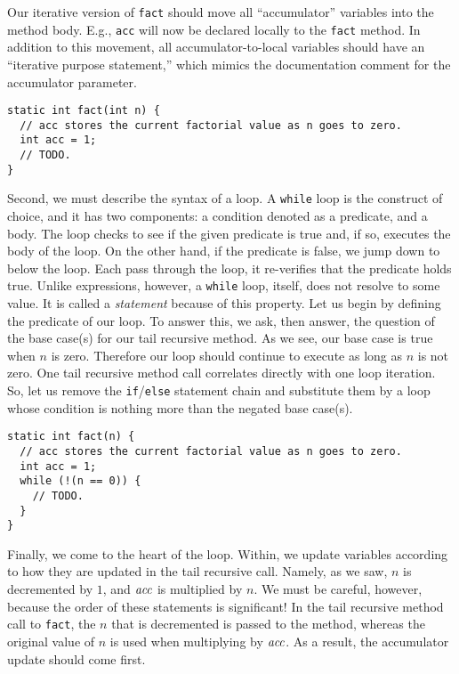 Our iterative version of \texttt{fact} should move all ``accumulator'' variables into the method body. E.g., \texttt{acc} will now be declared locally to the \texttt{fact} method. In addition to this movement, all accumulator-to-local variables should have an ``iterative purpose statement,'' which mimics the documentation comment for the accumulator parameter.


\begin{lstlisting}[language=MyJava]
static int fact(int n) {
  // acc stores the current factorial value as n goes to zero.
  int acc = 1;
  // TODO.
}
\end{lstlisting}

Second, we must describe the syntax of a loop. A \texttt{while} loop is the construct of choice, and it has two components: a condition denoted as a predicate, and a body. The loop checks to see if the given predicate is true and, if so, executes the body of the loop. On the other hand, if the predicate is false, we jump down to below the loop. Each pass through the loop, it re-verifies that the predicate holds true. Unlike expressions, however, a \texttt{while} loop, itself, does not resolve to some value. It is called a \emph{statement} because of this property. Let us begin by defining the predicate of our loop. To answer this, we ask, then answer, the question of the base case(s) for our tail recursive method. As we see, our base case is true when $n$ is zero. Therefore our loop should continue to execute as long as $n$ is not zero. One tail recursive method call correlates directly with one loop iteration. So, let us remove the \texttt{if}/\texttt{else} statement chain and substitute them by a loop whose condition is nothing more than the negated base case(s).

\begin{lstlisting}[language=MyJava]
static int fact(n) {
  // acc stores the current factorial value as n goes to zero.
  int acc = 1;
  while (!(n == 0)) {
    // TODO.
  }
}
\end{lstlisting}

Finally, we come to the heart of the loop. Within, we update variables according to how they are updated in the tail recursive call. Namely, as we saw, $n$ is decremented by $1$, and $\emph{acc}$ is multiplied by $n$. We must be careful, however, because the order of these statements is significant! In the tail recursive method call to \texttt{fact}, the $n$ that is decremented is passed to the method, whereas the original value of $n$ is used when multiplying by $\emph{acc}$. As a result, the accumulator update should come first.

